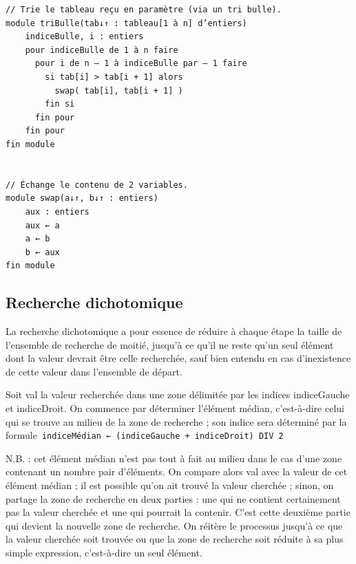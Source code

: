 \documentclass[11pt,a4paper]{article}
\begin{document}
            \par
        \begin{verbatim}
// Trie le tableau reçu en paramètre (via un tri bulle).
module triBulle(tab↓↑ : tableau[1 à n] d’entiers)
    indiceBulle, i : entiers
    pour indiceBulle de 1 à n faire
      pour i de n – 1 à indiceBulle par – 1 faire
        si tab[i] > tab[i + 1] alors
          swap( tab[i], tab[i + 1] )
        fin si
      fin pour
    fin pour
fin module


// Échange le contenu de 2 variables.
module swap(a↓↑, b↓↑ : entiers)
    aux : entiers
    aux ← a
    a ← b
    b ← aux
fin module
\end{verbatim}\subsection{Recherche dichotomique}
		    La recherche dichotomique a pour essence de r\'eduire \`a chaque \'etape la taille de l'ensemble
        de recherche de moiti\'e, jusqu'\`a ce qu'il ne reste qu'un seul \'el\'ement dont la valeur devrait
        \^etre celle recherch\'ee, sauf bien entendu en cas d'inexistence de cette valeur dans l'ensemble
        de d\'epart.
		  
            \par
        
		    Soit val la valeur recherch\'ee dans une zone d\'elimit\'ee par les indices indiceGauche et indiceDroit. 
		    On commence par d\'eterminer l'\'el\'ement m\'edian, c'est-\`a-dire celui qui se trouve \guillemotleft  au
        milieu \guillemotright  de la zone de recherche ; son indice sera d\'etermin\'e par la formule
        \,\verb|indiceMédian ← (indiceGauche + indiceDroit) DIV 2|\,
            \par
        
        N.B. : cet \'el\'ement m\'edian n'est pas tout \`a fait au milieu dans le cas d'une zone contenant un
        nombre pair d'\'el\'ements. On compare alors val avec la valeur de cet \'el\'ement m\'edian ; il est
        possible qu'on ait trouv\'e la valeur cherch\'ee ; sinon, on partage la zone de recherche en deux
        parties : une qui ne contient certainement pas la valeur cherch\'ee et une qui pourrait la
        contenir. C'est cette deuxi\`eme partie qui devient la nouvelle zone de recherche. On r\'eit\`ere
        le processus jusqu'\`a ce que la valeur cherch\'ee soit trouv\'ee ou que la zone de recherche soit
        r\'eduite \`a sa plus simple expression, c'est-\`a-dire un seul \'el\'ement.
		  
\end{document}
